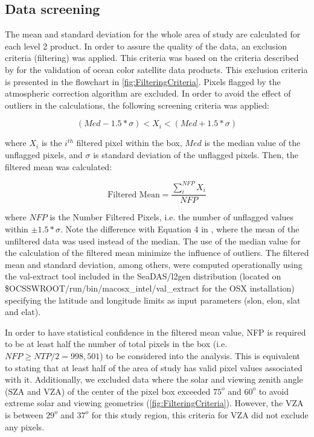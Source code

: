 \documentclass[onecolumn,3p,letterpaper,11pt]{elsarticle}
\begin{document}
\subsection{Data screening}
The mean and standard deviation for the whole area of study are calculated for each level 2 product. In order to assure the quality of the data, an exclusion criteria (filtering) was applied. This criteria was based on the criteria described by \citet{Bailey2006} for the validation of ocean color satellite data products. This exclusion criteria is presented in the flowchart in \autoref{fig:FilteringCriteria}. Pixels flagged by the atmospheric correction algorithm are excluded. In order to avoid the effect of outliers in the calculations, the following screening criteria was applied:
\begin{linenomath*}
\begin{equation}\label{eq:filtered_value}
  (Med-1.5*\sigma) <  X_i < (Med+1.5*\sigma)
\end{equation}
\end{linenomath*}
where $X_i$ is the $i^{th}$ filtered pixel within the box, $Med$ is the median value of the unflagged pixels, and $\sigma$ is standard deviation of the unflagged pixels. Then, the filtered mean was calculated:
\begin{linenomath*}
\begin{equation}\label{eq:filtered_mean}
  \text{Filtered Mean} =\frac{\displaystyle \sum_i^{NFP} X_i}{NFP}
\end{equation}
\end{linenomath*}
where $NFP$ is the Number Filtered Pixels, i.e. the number of unflagged values within $\pm 1.5*\sigma$. Note the difference with Equation 4 in \citet{Bailey2006}, where the mean of the unfiltered data was used instead of the median. The use of the median value for the calculation of the filtered mean minimize the influence of outliers. The filtered mean and standard deviation, among others, were computed operationally using the val-extract tool included in the SeaDAS/l2gen distribution (located on {\ttfamily \$OCSSWROOT/run/bin/macosx\_intel/val\_extract}  for the OSX installation) specifying the latitude and longitude limits as input parameters (slon, elon, slat and elat).

In order to have statistical confidence in the filtered mean value, NFP is required to be at least half the number of total pixels in the box (i.e. $NFP\geq NTP/2 = 998,501$) to be considered into the analysis. This is equivalent to stating that at least half of the area of study has valid pixel values associated with it. Additionally, we excluded data where the solar and viewing zenith angle (SZA and VZA) of the center of the pixel box exceeded $75^o$ and $60^o$ to avoid extreme solar and  viewing geometries \citep{Bailey2006} (\autoref{fig:FilteringCriteria}). However, the VZA is between $29^o$ and $37^o$ for this study region, this criteria for VZA did not exclude any pixels.
\end{document}
